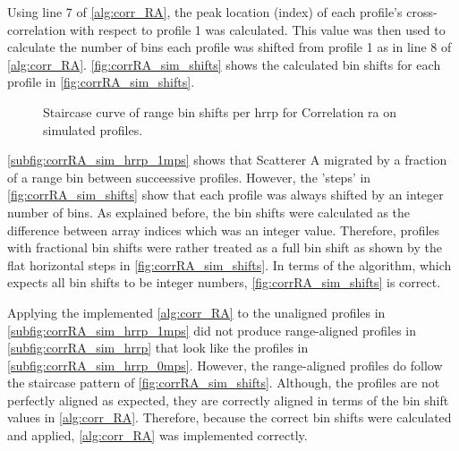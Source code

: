 \documentclass[class=report,11pt,crop=false]{standalone}
\begin{document}
    Using line 7 of \autoref{alg:corr_RA}, the peak location (index) of each profile's cross-correlation with respect to profile 1 was calculated. This value was then used to calculate the number of bins each profile was shifted from profile 1 as in line 8 of \autoref{alg:corr_RA}. \autoref{fig:corrRA_sim_shifts} shows the calculated bin shifts for each profile in \autoref{fig:corrRA_sim_shifts}.

    \begin{figure}
        \centering
        \resizebox{0.45\linewidth}{!}{}
        \caption{Staircase curve of range bin shifts per \gls{hrrp} for Correlation \gls{ra} on simulated profiles.\label{fig:corrRA_sim_shifts}}
    \end{figure}
    
    \autoref{subfig:corrRA_sim_hrrp_1mps} shows that Scatterer A migrated by a fraction of a range bin between succeessive profiles. However, the 'steps' in \autoref{fig:corrRA_sim_shifts} show that each profile was always shifted by an integer number of bins. As explained before, the bin shifts were calculated as the difference between array indices which was an integer value. Therefore, profiles with fractional bin shifts were rather treated as a full bin shift as shown by the flat horizontal steps in \autoref{fig:corrRA_sim_shifts}. In terms of the algorithm, which expects all bin shifts to be integer numbers, \autoref{fig:corrRA_sim_shifts} is correct.

    Applying the implemented \autoref{alg:corr_RA} to the unaligned profiles in \autoref{subfig:corrRA_sim_hrrp_1mps} did not produce range-aligned profiles in \autoref{subfig:corrRA_sim_hrrp} that look like the profiles in \autoref{subfig:corrRA_sim_hrrp_0mps}. However, the range-aligned profiles do follow the staircase pattern of \autoref{fig:corrRA_sim_shifts}. Although, the profiles are not perfectly aligned as expected, they are correctly aligned in terms of the bin shift values in \autoref{alg:corr_RA}. Therefore, because the correct bin shifts were calculated and applied, \autoref{alg:corr_RA} was implemented correctly.
\end{document}
